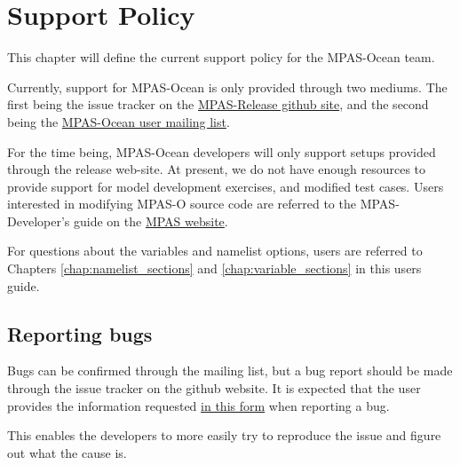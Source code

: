 \chapter{Support Policy}
\label{chap:ocean-support}
This chapter will define the current support policy for the MPAS-Ocean team.

Currently, support for MPAS-Ocean is only provided through two mediums. The
first being the issue tracker on the
\href{https://github.com/MPAS-Dev/MPAS-Release/issues?state=open}{MPAS-Release
github site}, and the second being the
\href{https://groups.google.com/forum/#!forum/mpas-users}{MPAS-Ocean user
mailing list}. 

For the time being, MPAS-Ocean developers will only support setups provided
through the release web-site. At present, we do not have enough resources to
provide support for model development exercises, and modified test cases. Users
interested in modifying MPAS-O source code are referred to the MPAS-Developer's
guide on the \href{http://mpas-dev.github.io/}{MPAS website}.

For questions about the variables and namelist options, users are referred to
Chapters  \ref{chap:namelist_sections} and \ref{chap:variable_sections} in this
users guide.

\section{Reporting bugs}
\label{sec:bug-reports}
Bugs can be confirmed through the mailing list, but a bug report should be
made through the issue tracker on the github website.
It is expected that the user provides the information requested
\href{https://gist.github.com/douglasjacobsen/5868321}{in this form} when
reporting a bug.

This enables the developers to more easily try to reproduce the issue and
figure out what the cause is.

